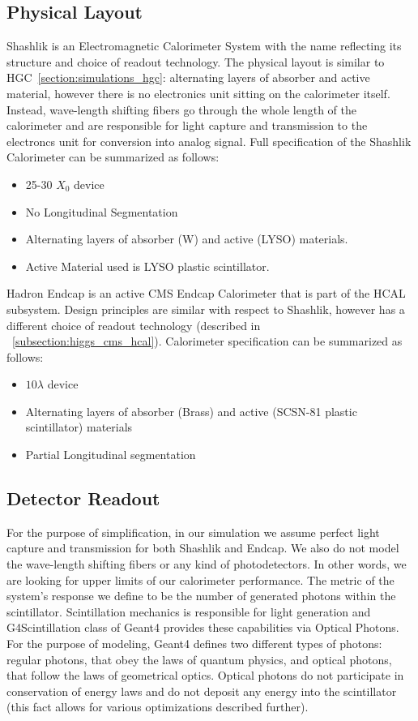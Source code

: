 \subsection{Physical Layout}
Shashlik is an Electromagnetic Calorimeter System with the name reflecting its  structure and choice of readout technology. The physical layout is similar to HGC~\ref{section:simulations_hgc}: alternating layers of absorber and active material, however there is no electronics unit sitting on the calorimeter itself. Instead, wave-length shifting fibers go through the whole length of the calorimeter and are responsible for light capture and transmission to the electroncs unit for conversion into analog signal. Full specification of the Shashlik Calorimeter can be summarized as follows:
\begin{itemize}
    \item 25-30 $X_0$ device
    \item No Longitudinal Segmentation
    \item Alternating layers of absorber (W) and active (LYSO) materials.
    \item Active Material used is LYSO plastic scintillator.
\end{itemize}
Hadron Endcap is an active CMS Endcap Calorimeter that is part of the HCAL subsystem. Design principles are similar with respect to Shashlik, however has a different choice of readout technology (described in ~\ref{subsection:higgs_cms_hcal}). Calorimeter specification can be summarized as follows:
\begin{itemize}
    \item $10\lambda$ device
    \item Alternating layers of absorber (Brass) and active (SCSN-81 plastic scintillator) materials
    \item Partial Longitudinal segmentation
\end{itemize}

\subsection{Detector Readout}
For the purpose of simplification, in our simulation we assume perfect light capture and transmission for both Shashlik and Endcap. We also do not model the wave-length shifting fibers or any kind of photodetectors. In other words, we are looking for upper limits of our calorimeter performance. The metric of the system's response we define to be the number of generated photons within the scintillator. Scintillation mechanics is responsible for light generation and G4Scintillation class of Geant4 provides these capabilities via Optical Photons. For the purpose of modeling, Geant4 defines two different types of photons: regular photons, that obey the laws of quantum physics, and optical photons, that follow the laws of geometrical optics. Optical photons do not participate in conservation of energy laws and do not deposit any energy into the scintillator (this fact allows for various optimizations described further).

